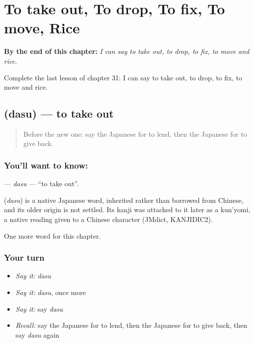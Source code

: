 
\chapter{To take out, To drop, To fix, To move, Rice}
\label{ch:ja-to-take-out-to-drop-to-fix-to-move-rice}

\begin{chapteropening}
\textbf{By the end of this chapter:} \emph{I can say to take out, to drop, to fix, to move and rice.}

Complete the last lesson of chapter 31: I can say to take out, to drop, to fix, to move and rice.
\end{chapteropening}

\section[\texorpdfstring{\ja{だす} (dasu)}{だす (dasu)}]{ (dasu) — to take out}

\label{lesson:JA-C31-dasu}



\begin{quote}
Before the new one: say the Japanese for to lend, then the Japanese for to give back.
\end{quote}

\subsection*{You'll want to know: }
\textbf{} — \emph{dasu} — \textquotedblleft{}to take out\textquotedblright{}.

\begin{cousinweb}
\textbf{} (\emph{dasu}) is a native Japanese word, inherited rather than borrowed from Chinese, and its older origin is not settled. Its kanji was attached to it later as a kun'yomi, a native reading given to a Chinese character (JMdict, KANJIDIC2).
\end{cousinweb}

\begin{grammarlens}[title={What you've built}]
One more word for this chapter.
\end{grammarlens}

\subsection*{Your turn}
\begin{itemize}
\raggedright
  \item \emph{Say it:} \emph{dasu}
  \item \emph{Say it:} \emph{dasu}, once more
  \item \emph{Say it:} say \emph{dasu}
  \item \emph{Recall:} say the Japanese for to lend, then the Japanese for to give back, then say \emph{dasu} again
\end{itemize}


